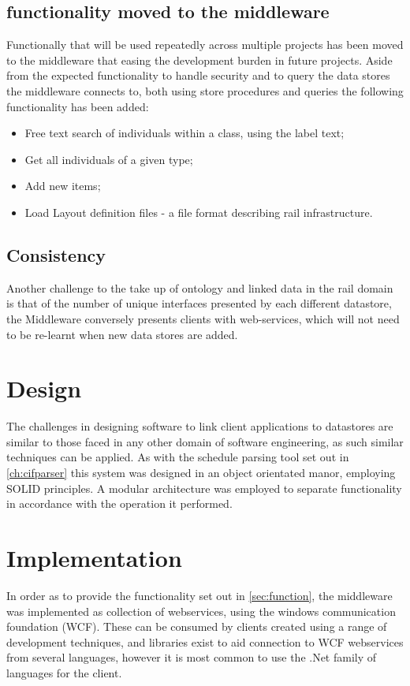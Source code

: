 \subsection{functionality moved to the middleware}\label{midfunc}
Functionally that will be used repeatedly across multiple projects has been moved to the middleware that easing the development burden in future projects. Aside from the expected functionality to handle security and to query the data stores the middleware connects to, both using store procedures and queries the following functionality has been added:
\begin{itemize}
    \item Free text search of individuals within a class, using the label text;
    \item Get all individuals of a given type;
    \item Add new items;
    \item Load Layout definition files - a file format describing rail infrastructure. 
\end{itemize}

\subsection{Consistency}
Another challenge to the take up of ontology and linked data in the rail domain is that of the number of unique interfaces presented by each different datastore, the Middleware conversely presents clients with web-services, which will not need to be re-learnt when new data stores are added. 

\section{Design}
The challenges in designing software to link client applications to datastores are similar to those faced in any other domain of software engineering, as such similar techniques can be applied. As with the schedule parsing tool set out in \autoref{ch:cifparser} this system was designed in an object orientated manor, employing SOLID principles. A modular architecture was employed to separate functionality in accordance with the operation it performed. 

\section{Implementation}
In order as to provide the functionality set out in \autoref{sec:function}, the middleware was implemented as collection of webservices, using the windows communication foundation (WCF). These can be consumed by clients created using a range of development techniques, and libraries exist to aid connection to WCF webservices from several languages, however it is most common to use the .Net family of languages for the client.

